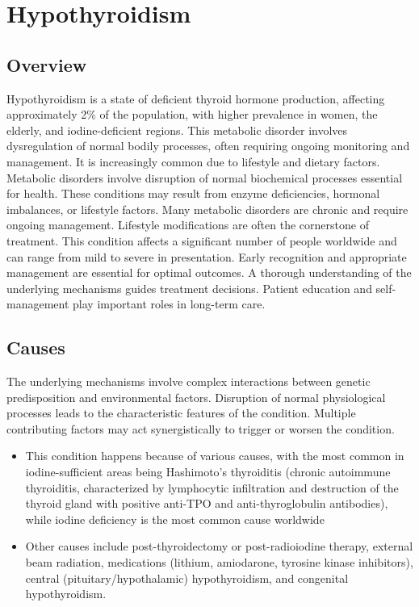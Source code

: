 \chapter{Hypothyroidism}
\label{sec:Hypothyroidism}

\section{Overview}
Hypothyroidism is a state of deficient thyroid hormone production, affecting approximately 2\% of the population, with higher prevalence in women, the elderly, and iodine-deficient regions. This metabolic disorder involves dysregulation of normal bodily processes, often requiring ongoing monitoring and management. It is increasingly common due to lifestyle and dietary factors. Metabolic disorders involve disruption of normal biochemical processes essential for health. These conditions may result from enzyme deficiencies, hormonal imbalances, or lifestyle factors. Many metabolic disorders are chronic and require ongoing management. Lifestyle modifications are often the cornerstone of treatment. This condition affects a significant number of people worldwide and can range from mild to severe in presentation. Early recognition and appropriate management are essential for optimal outcomes. A thorough understanding of the underlying mechanisms guides treatment decisions. Patient education and self-management play important roles in long-term care.
\section{Causes}
The underlying mechanisms involve complex interactions between genetic predisposition and environmental factors. Disruption of normal physiological processes leads to the characteristic features of the condition. Multiple contributing factors may act synergistically to trigger or worsen the condition.

\begin{itemize}[noitemsep]
  \item This condition happens because of various causes, with the most common in iodine-sufficient areas being Hashimoto's thyroiditis (chronic autoimmune thyroiditis, characterized by lymphocytic infiltration and destruction of the thyroid gland with positive anti-TPO and anti-thyroglobulin antibodies), while iodine deficiency is the most common cause worldwide
  \item Other causes include post-thyroidectomy or post-radioiodine therapy, external beam radiation, medications (lithium, amiodarone, tyrosine kinase inhibitors), central (pituitary/hypothalamic) hypothyroidism, and congenital hypothyroidism.
\end{itemize}
